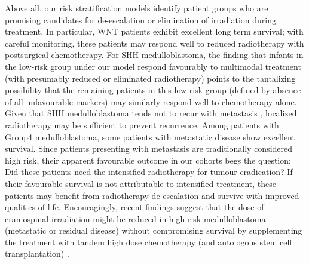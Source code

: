 Above all, our risk stratification models identify patient groups who are promising candidates for de-escalation or elimination of irradiation during treatment. In particular, WNT patients exhibit excellent long term survival; with careful monitoring, these patients may respond well to reduced radiotherapy with postsurgical chemotherapy. For SHH medulloblastoma, the finding that infants in the low-risk group under our model respond favourably to multimodal treatment (with presumably reduced or eliminated radiotherapy) points to the tantalizing possibility that the remaining patients in this low risk group (defined by absence of all unfavourable markers) may similarly respond well to chemotherapy alone. Given that SHH medulloblastoma tends not to recur with metastasis , localized radiotherapy may be sufficient to prevent recurrence. Among patients with Group4 medulloblastoma, some patients with metastatic disease show excellent survival. Since patients presenting with metastasis are traditionally considered high risk, their apparent favourable outcome in our cohorts begs the question: Did these patients need the intensified radiotherapy for tumour eradication? If their favourable survival is not attributable to intensified treatment, these patients may benefit from radiotherapy de-escalation and survive with improved qualities of life. Encouragingly, recent findings suggest that the dose of craniospinal irradiation might be reduced in high-risk medulloblastoma (metastatic or residual disease) without compromising survival by supplementing the treatment with tandem high dose chemotherapy (and autologous stem cell transplantation) .


